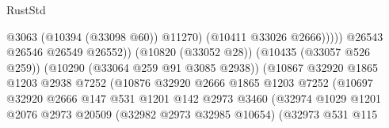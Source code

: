 \begin{lexlean}{RustStd}
\begin{coremodule}
                                                              @3063
                                                              (@10394 (@33098 @60))
                                                              @11270)
                                                            (@10411 @33026 @2666)))))
                                                    @26543
                                                    @26546
                                                    @26549
                                                    @26552))
                                                (@10820 (@33052 @28))
                                                (@10435 (@33057 @526 @259))
                                                (@10290 (@33064 @259 @91 @3085 @2938))
                                                (@10867
                                                  @32920
                                                  @1865
                                                  @1203
                                                  @2938
                                                  @7252
                                                  (@10876
                                                    @32920
                                                    @2666
                                                    @1865
                                                    @1203
                                                    @7252
                                                    (@10697
                                                      @32920
                                                      @2666
                                                      @147
                                                      @531
                                                      @1201
                                                      @142
                                                      @2973
                                                      @3460
                                                      (@32974
                                                        @1029
                                                        @1201
                                                        @2076
                                                        @2973
                                                        @20509
                                                        (@32982 @2973 @32985 @10654)
                                                        (@32973
                                                          @531
                                                          @115

\end{coremodule}
\end{lexlean}

